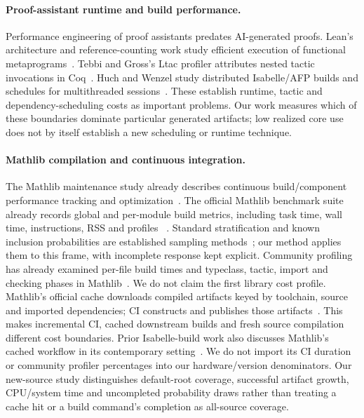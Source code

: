 \documentclass[10pt,twocolumn]{article}
\begin{document}
\paragraph{Proof-assistant runtime and build performance.}
Performance engineering of proof assistants predates AI-generated proofs.
Lean's architecture and reference-counting work study efficient execution
of functional metaprograms~\cite{lean4,countingBeans}.
Tebbi and Gross's Ltac profiler attributes nested tactic invocations in
Coq~\cite{ltacProfiler2015}. Huch and Wenzel study distributed Isabelle/AFP
builds and schedules for multithreaded sessions~\cite{isabelleBuild2024}.
These establish runtime, tactic and dependency-scheduling costs as important
problems. Our work measures which of these boundaries dominate particular
generated artifacts; low realized core use does not by itself establish a
new scheduling or runtime technique.

\paragraph{Mathlib compilation and continuous integration.}
The Mathlib maintenance study already describes continuous build/component
performance tracking and optimization~\cite{growingMathlib2025}.
The official Mathlib benchmark suite already records global and per-module
build metrics, including task time, wall time, instructions, RSS and profiles
~\cite{mathlibBench2026}. Standard stratification and known inclusion
probabilities are established sampling methods~\cite{samplingStatCan}; our
method applies them to this frame, with incomplete response kept explicit.
Community profiling has already examined per-file build times and
typeclass, tactic, import and checking phases in Mathlib~\cite{stollMathlib2024}.
We do not claim the first library cost profile.
Mathlib's official cache downloads compiled artifacts keyed by toolchain,
source and imported dependencies; CI constructs and publishes those
artifacts~\cite{mathlibCache2026}.
This makes incremental CI, cached downstream builds and fresh source
compilation different cost boundaries.
Prior Isabelle-build work also discusses Mathlib's cached workflow in its
contemporary setting~\cite{isabelleBuild2024}.
We do not import its CI duration or community profiler percentages into our
hardware/version denominators.
Our new-source study distinguishes default-root coverage, successful artifact
growth, CPU/system time and uncompleted probability draws rather than
treating a cache hit or a build command's completion as all-source coverage.
\end{document}
